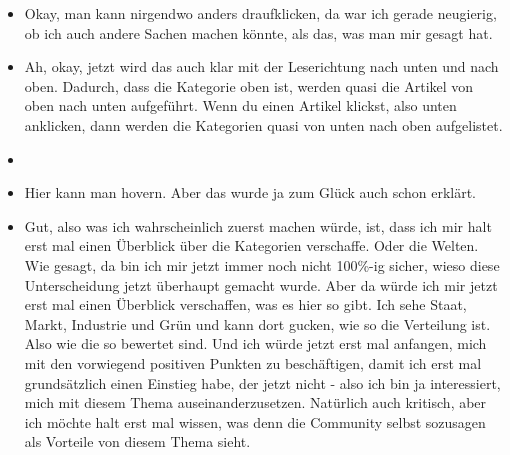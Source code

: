 {\begin{itemize}[]
                  Ich verstehe jetzt nicht sofort zu 100\% was gleich passieren wird, aber ich bin auch eher so der Typ, der sich eine Sache erst mal so oberflächlich durchliest, sage ich mal und dann einfach ausprobiert, was passiert.
                  Ich schätze mal, dass es da unterschiedliche Typen geben wird, also dass andere Leute da anders mit umgehen würden.
                  Aber ich bin jetzt nicht davor davon abgeschreckt, irgendwo drauf zu klicken, selbst wenn ich den Text jetzt nicht zu 100\% verstehe.
                  Aber wie gesagt, also zu 100\% verstehe ich jetzt nicht, was passieren wird.
                  Ich denke mir dann, dass ich das gleich einfach sehen werde.
            \item {} Okay, man kann nirgendwo anders draufklicken, da war ich gerade neugierig, ob ich auch andere Sachen machen könnte, als das, was man mir gesagt hat.
            \item {} Ah, okay, jetzt wird das auch klar mit der Leserichtung nach unten und nach oben.
                  Dadurch, dass die Kategorie oben ist, werden quasi die Artikel von oben nach unten aufgeführt.
                  Wenn du einen Artikel klickst, also unten anklicken, dann werden die Kategorien quasi von unten nach oben aufgelistet.
            \item {}
            \item {} Hier kann man hovern.
                  Aber das wurde ja zum Glück auch schon erklärt.
            \item {} Gut, also was ich wahrscheinlich zuerst machen würde, ist, dass ich mir halt erst mal einen Überblick über die Kategorien verschaffe.
                  Oder die Welten.
                  Wie gesagt, da bin ich mir jetzt immer noch nicht 100\%-ig sicher, wieso diese Unterscheidung jetzt überhaupt gemacht wurde.
                  Aber da würde ich mir jetzt erst mal einen Überblick verschaffen, was es hier so gibt.
                  Ich sehe Staat, Markt, Industrie und Grün und kann dort gucken, wie so die Verteilung ist.
                  Also wie die so bewertet sind.
                  Und ich würde jetzt erst mal anfangen, mich mit den vorwiegend positiven Punkten zu beschäftigen, damit ich erst mal grundsätzlich einen Einstieg habe, der jetzt nicht - also ich bin ja interessiert, mich mit diesem Thema auseinanderzusetzen.
                  Natürlich auch kritisch, aber ich möchte halt erst mal wissen, was denn die Community selbst sozusagen als Vorteile von diesem Thema sieht.

\end{itemize}}
